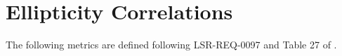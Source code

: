 \documentclass[DM,toc]{lsstdoc}
\begin{document}


\section{Ellipticity Correlations}\label{ellipticity-correlations}

The following metrics are defined following LSR-REQ-0097
 and Table 27 of .
\end{document}

